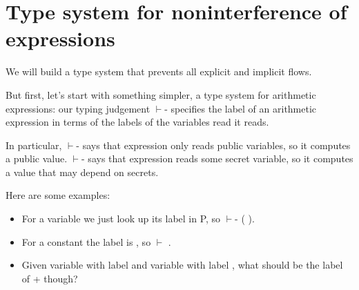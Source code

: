 \documentclass[12pt]{report}
\begin{document}
\section{Type system for noninterference of expressions}



 We will build a type system that prevents all explicit and
    implicit flows.


    But first, let's start with something simpler, a type system for
    arithmetic expressions: our typing judgement  \ensuremath{\vdash}-   
    specifies the label  of an arithmetic expression  in terms
    of the labels of the variables read it reads.


    In particular,  \ensuremath{\vdash}-    says that expression 
    only reads public variables, so it computes a public value.
     \ensuremath{\vdash}-    says that expression  reads some secret
    variable, so it computes a value that may depend on secrets. 

 Here are some examples:

\begin{itemize}
\item  For a variable  we just look up its label in P, so
       \ensuremath{\vdash}-   ( ).

\item  For a constant  the label is , so
       \ensuremath{\vdash}   .

\item  Given variable  with label  and variable  with
      label , what should be the label of  +  though? 

\end{itemize}
\begin{coqdoccode}
\coqdocemptyline
\end{coqdoccode}
\end{document}
